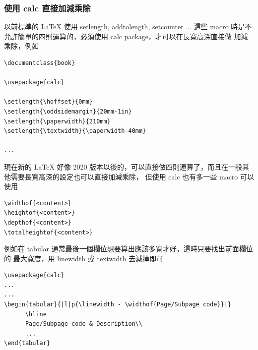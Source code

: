     \subsubsection{使用 calc 直接加減乘除}
    以前標準的 \LaTeX{} 使用 setlength, addtolength, setcounter ... 這些 macro
    時是不允許簡單的四則運算的，必須使用 calc package，才可以在長寬高深直接做
    加減乘除，例如
    \begin{verbatim}
\documentclass{book}

\usepackage{calc}

\setlength{\hoffset}{0mm}
\setlength{\oddsidemargin}{20mm-1in}
\setlength{\paperwidth}{210mm}
\setlength{\textwidth}{\paperwidth-40mm}

...

    \end{verbatim}
    現在新的 \LaTeX{} 好像 2020 版本以後的，可以直接做四則運算了，而且在一般其
    他需要長寬高深的設定也可以直接加減乘除， 但使用 calc 也有多一些 macro
    可以使用
    \begin{verbatim}
\widthof{<content>}
\heightof{<content>}
\depthof{<content>}
\totalheightof{<content>}
    \end{verbatim}
    例如在 tabular 通常最後一個欄位想要算出應該多寬才好，這時只要找出前面欄位的
    最大寬度，用 linewidth 或 textwidth 去減掉即可
    \begin{verbatim}
\usepackage{calc}
...
...
\begin{tabular}{|l|p{\linewidth - \widthof{Page/Subpage code}}|}
      \hline
      Page/Subpage code & Description\\
      ...
\end{tabular}
    \end{verbatim}

